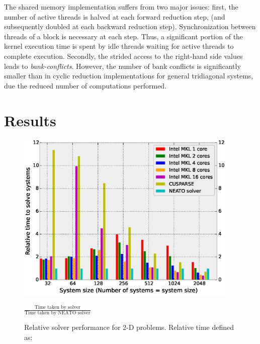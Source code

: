 \documentclass{elsarticle}
\begin{document}
The shared memory implementation suffers from two major issues:
first, the number of active threads is halved at each forward reduction step,
(and subsequently doubled at each backward reduction step).
Synchronization between threads of a block is necessary at each step.
Thus, a significant portion of the kernel execution time is
spent by idle threads waiting for active threads to complete execution.
Secondly, the strided access to the
right-hand side values leads to \emph{bank-conflicts}.
However, the number of bank conflicts is significantly smaller
than in cyclic reduction implementations for general tridiagonal systems,
due the reduced number of computations performed.

\section{Results} \label{sec:results-single-gpu}

\begin{figure}
\begin{center}
\includegraphics[width=300pt]{fig/bench-2d.eps}
\caption{Relative solver performance for 2-D problems. Relative time defined as:}
$\frac{\text{Time taken by solver}}{\text{Time taken by NEATO solver}}$
\label{fig:bench-2d}
\end{center}
\end{figure}
\end{document}
